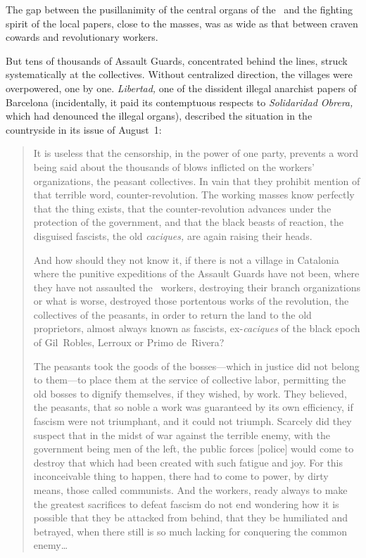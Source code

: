 The gap between the pusillanimity of the central organs of the \CNT\ and the fighting spirit of the local papers, close to the masses, was as wide as that between craven cowards and revolutionary workers.

But tens of thousands of Assault Guards, concentrated behind the lines, struck systematically at the collectives. Without centralized direction, the villages were overpowered, one by one. \emph{Libertad,} one of the dissident illegal anarchist papers of Barcelona (incidentally, it paid its contemptuous respects to \emph{Solidaridad Obrera,} which had denounced the illegal organs), described the situation in the countryside in its issue of August~1:

\begin{quotation}
  It is useless that the censorship, in the power of one party, prevents a word being said about the thousands of blows inflicted on the workers’ organizations, the peasant collectives. In vain that they prohibit mention of that terrible word, counter-revolution. The working masses know perfectly that the thing exists, that the counter-revolution advances under the protection of the government, and that the black beasts of reaction, the disguised fascists, the old \emph{caciques,} are again raising their heads.
  
  And how should they not know it, if there is not a village in Catalonia where the punitive expeditions of the Assault Guards have not been, where they have not assaulted the \CNT\ workers, destroying their branch organizations or what is worse, destroyed those portentous works of the revolution, the collectives of the peasants, in order to return the land to the old proprietors, almost always known as fascists, ex-\emph{caciques} of the black epoch of Gil~Robles, Lerroux or Primo de~Rivera?
  
  The peasants took the goods of the bosses---which in justice did not belong to them---to place them at the service of collective labor, permitting the old bosses to dignify themselves, if they wished, by work. They believed, the peasants, that so noble a work was guaranteed by its own efficiency, if fascism were not triumphant, and it could not triumph. Scarcely did they suspect that in the midst of war against the terrible enemy, with the government being men of the left, the public forces [police] would come to destroy that which had been created with such fatigue and joy. For this inconceivable thing to happen, there had to come to power, by dirty means, those called communists. And the workers, ready always to make the greatest sacrifices to defeat fascism do not end wondering how it is possible that they be attacked from behind, that they be humiliated and betrayed, when there still is so much lacking for conquering the common enemy\dots
  

\end{quotation}
